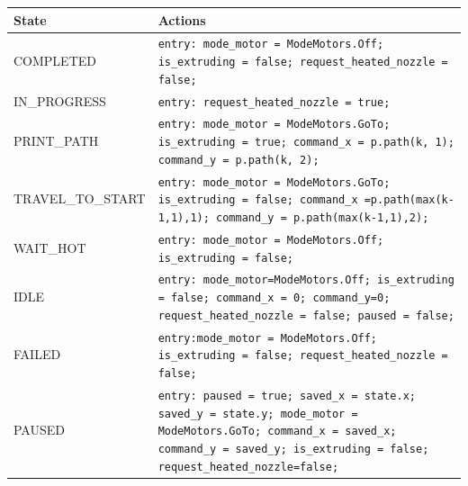 \begin{tabular}{@{}lp{}@{}}
\toprule
State & Actions \\
\midrule
COMPLETED & \texttt{entry: mode\_motor = ModeMotors.Off; is\_extruding = false; request\_heated\_nozzle = false;} \\
IN\_PROGRESS & \texttt{entry: request\_heated\_nozzle = true;} \\
\quad PRINT\_PATH & \texttt{entry: mode\_motor = ModeMotors.GoTo; is\_extruding = true; command\_x = p.path(k, 1); command\_y = p.path(k, 2);} \\
\quad TRAVEL\_TO\_START & \texttt{entry: mode\_motor = ModeMotors.GoTo; is\_extruding = false; command\_x =p.path(max(k-1,1),1); command\_y = p.path(max(k-1,1),2);} \\
\quad WAIT\_HOT & \texttt{entry: mode\_motor = ModeMotors.Off; is\_extruding = false;} \\
IDLE & \texttt{entry: mode\_motor=ModeMotors.Off; is\_extruding = false; command\_x = 0; command\_y=0; request\_heated\_nozzle = false; paused = false;} \\
FAILED & \texttt{entry:mode\_motor = ModeMotors.Off; is\_extruding = false; request\_heated\_nozzle = false;} \\
PAUSED & \texttt{entry: paused = true; saved\_x = state.x; saved\_y = state.y; mode\_motor = ModeMotors.GoTo; command\_x = saved\_x; command\_y = saved\_y; is\_extruding = false; request\_heated\_nozzle=false;} \\
\bottomrule
\end{tabular}
